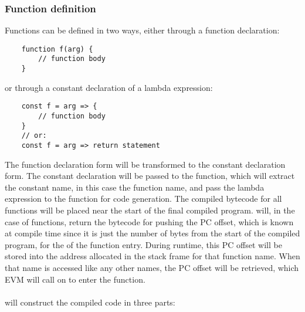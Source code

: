 \subsubsection{Function definition}
Functions can be defined in two ways, either through a function declaration: 
\begin{verbatim}
    function f(arg) {
        // function body
    }
\end{verbatim}
or through a constant declaration of a lambda expression: 
\begin{verbatim}
    const f = arg => {
        // function body
    }
    // or: 
    const f = arg => return statement
\end{verbatim}
The function declaration form will be transformed to the constant declaration form. The constant declaration will be passed to the  function, which will extract the constant name, in this case the function name, and pass the lambda expression to the  function for code generation. The compiled bytecode for all functions will be placed near the start of the final compiled program.  will, in the case of functions, return the bytecode for pushing the PC offset, which is known at compile time since it is just the number of bytes from the start of the compiled program, for the  of the function entry. During runtime, this PC offset will be stored into the address allocated in the stack frame for that function name. When that name is accessed like any other names, the PC offset will be retrieved, which EVM will call  on to enter the function. \\\\
 will construct the compiled code in three parts: 
